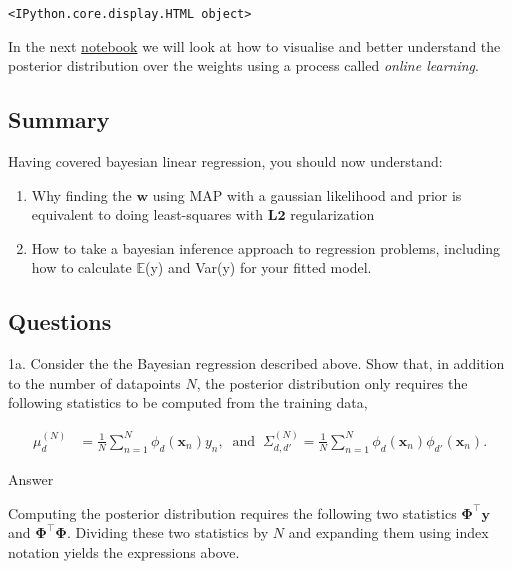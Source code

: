 \documentclass[11pt]{article}
\providecommand{\tightlist}{%
      \setlength{\itemsep}{0pt}\setlength{\parskip}{0pt}}
\begin{document}
    
    \begin{verbatim}
<IPython.core.display.HTML object>
    \end{verbatim}

    
    In the next
\href{regression_bayesian-online-visualisations.ipynb}{notebook} we will
look at how to visualise and better understand the posterior
distribution over the weights using a process called \emph{online
learning}.

\subsection{Summary}\label{summary}

Having covered bayesian linear regression, you should now understand:

\begin{enumerate}
\def\labelenumi{\arabic{enumi}.}
\tightlist
\item
  Why finding the \(\mathbf{w}\) using MAP with a gaussian likelihood
  and prior is equivalent to doing least-squares with \(\mathbf{L2}\)
  regularization
\item
  How to take a bayesian inference approach to regression problems,
  including how to calculate \(\mathbb{E}\)(y) and Var(y) for your
  fitted model.
\end{enumerate}

    \subsection{Questions}\label{questions}

1a. Consider the the Bayesian regression described above. Show that, in
addition to the number of datapoints \(N\), the posterior distribution
only requires the following statistics to be computed from the training
data,

\begin{align}
\mu^{(N)}_{d} &= \frac{1}{N}\sum_{n=1}^N \phi_d(\mathbf{x}_n) y_n, \;\; \text{and} \;\;
\Sigma^{(N)}_{d,d'} = \frac{1}{N}\sum_{n=1}^N \phi_d(\mathbf{x}_n) \phi_{d'}(\mathbf{x}_n). 
\end{align}

 Answer

Computing the posterior distribution requires the following two
statistics \(\boldsymbol{\Phi}^\top \mathbf{y}\) and
\(\boldsymbol{\Phi}^\top \boldsymbol{\Phi}\). Dividing these two
statistics by \(N\) and expanding them using index notation yields the
expressions above.
\end{document}
